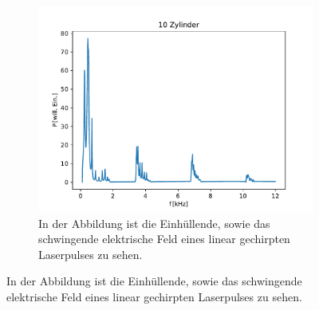 \begin{figure}[ht]
                \centering
                \begin{subfigure}[b]{0.45\textwidth}
                    \centering
                    \includegraphics[scale=0.45]{./pictures/1dim_10_Zylinder_16mm.pdf}
                    \caption{In der Abbildung ist die Einhüllende, sowie das schwingende elektrische Feld eines linear gechirpten Laserpulses zu sehen.}
                    \label{fig:1dim_10_Zylinder_16mm}
                \end{subfigure}
            \end{figure}
            \FloatBarrier


